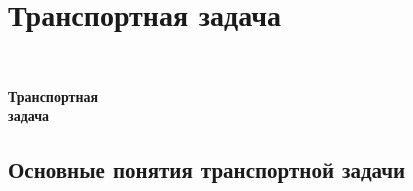 \documentclass[unicode,11pt,notheorems,xcolor=table]{beamer}
\begin{document}
{
%
\section{Транспортная задача}{}
\begin{frame}{}{}
~
\vspace{4cm}

	{\centering
		\LARGE
		\bfseries
		\color{white}
		Транспортная\\ задача
		\bigskip
		\par}
\end{frame}
}

\subsection{Основные понятия транспортной задачи}
\end{document}
